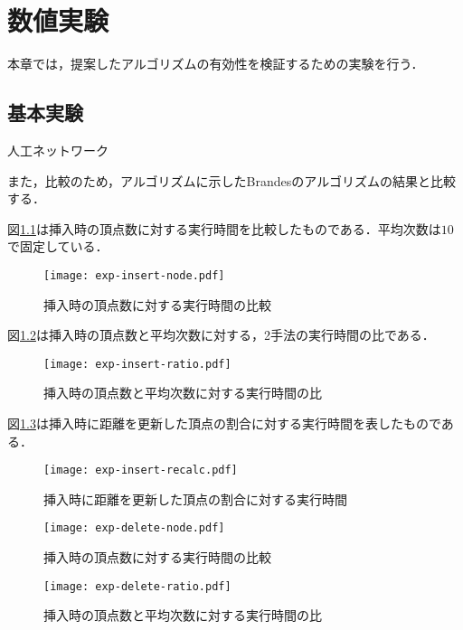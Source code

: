 \chapter{数値実験}

本章では，提案したアルゴリズムの有効性を検証するための実験を行う．

\section{基本実験}

人工ネットワーク

また，比較のため，アルゴリズムに示したBrandesのアルゴリズムの結果と比較する．

図\ref{fig:exp-insert-node}は挿入時の頂点数に対する実行時間を比較したものである．平均次数は$10$で固定している．

\begin{figure}[tb]
  \centering
  \texttt{[image: exp-insert-node.pdf]}
  \caption{挿入時の頂点数に対する実行時間の比較}
  \label{fig:exp-insert-node}
\end{figure}

図\ref{fig:exp-insert-ratio}は挿入時の頂点数と平均次数に対する，2手法の実行時間の比である．

\begin{figure}[tb]
  \centering
  \texttt{[image: exp-insert-ratio.pdf]}
  \caption{挿入時の頂点数と平均次数に対する実行時間の比}
  \label{fig:exp-insert-ratio}
\end{figure}

図\ref{fig:exp-insert-recalc}は挿入時に距離を更新した頂点の割合に対する実行時間を表したものである．

\begin{figure}[tb]
  \centering
  \texttt{[image: exp-insert-recalc.pdf]}
  \caption{挿入時に距離を更新した頂点の割合に対する実行時間}
  \label{fig:exp-insert-recalc}
\end{figure}

\begin{figure}[tb]
  \centering
  \texttt{[image: exp-delete-node.pdf]}
  \caption{挿入時の頂点数に対する実行時間の比較}
  \label{fig:exp-delete-node}
\end{figure}

\begin{figure}[tb]
  \centering
  \texttt{[image: exp-delete-ratio.pdf]}
  \caption{挿入時の頂点数と平均次数に対する実行時間の比}
  \label{fig:exp-delete-ratio}
\end{figure}

